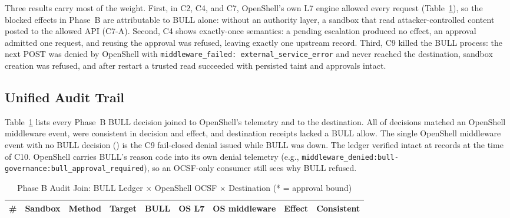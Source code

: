 \documentclass[journal]{IEEEtran}
\newcommand{\bull}{\textsc{BULL}}
\newcommand{\openshell}{OpenShell}
\begin{document}
Three results carry most of the weight. First, in C2, C4, and C7, \openshell{}'s own L7 engine allowed every request (Table~\ref{tab:corr}), so the blocked effects in Phase~B are attributable to \bull{} alone: without an authority layer, a sandbox that read attacker-controlled content posted to the allowed API (C7-A). Second, C4 shows exactly-once semantics: a pending escalation produced no effect, an approval admitted one request, and reusing the approval was refused, leaving exactly one upstream record. Third, C9 killed the \bull{} process: the next POST was denied by \openshell{} with \texttt{middleware\_failed: external\_service\_error} and never reached the destination, sandbox creation was refused, and after restart a trusted read succeeded with persisted taint and approvals intact.

\subsection{Unified Audit Trail}
Table~\ref{tab:corr} lists every Phase~B \bull{} decision joined to \openshell{}'s telemetry and to the destination. All \corrMatched{} of \corrDecisions{} decisions matched an \openshell{} middleware event, \corrConsistent{} were consistent in decision and effect, and \corrUnexplained{} destination receipts lacked a \bull{} allow. The single \openshell{} middleware event with no \bull{} decision (\corrOrphans{}) is the C9 fail-closed denial issued while \bull{} was down. The ledger verified intact at \ledgerRecordsCTen{} records at the time of C10. \openshell{} carries \bull{}'s reason code into its own denial telemetry (e.g., \texttt{middleware\_denied:\allowbreak bull-governance:\allowbreak bull\_approval\_required}), so an OCSF-only consumer still sees why \bull{} refused.

\begin{table}[!t]
\caption{Phase B Audit Join: \bull{} Ledger $\times$ \openshell{} OCSF $\times$ Destination (* = approval bound)}
\label{tab:corr}
\centering
\scriptsize
\begin{tabular}{rllllllll}
\toprule
\# & \textbf{Sandbox} & \textbf{Method} & \textbf{Target} & \textbf{\bull{}} & \textbf{OS L7} & \textbf{OS middleware} & \textbf{Effect} & \textbf{Consistent} \\
\midrule

\end{tabular}
\end{table}
\end{document}
